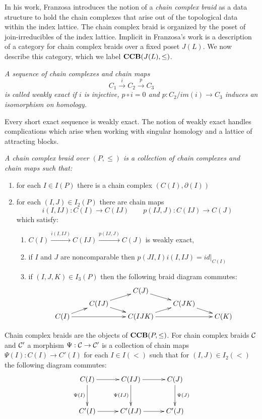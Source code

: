 In his work, Franzosa introduces the notion of a {\em chain complex braid} as a data structure to hold the chain complexes that arise out of the topological data within the index lattice.  The chain complex braid is organized by the poset of join-irreducibles of the index lattice.  Implicit in Franzosa's work is a description of a category for chain complex braids over a fixed poset $J(L)$.  We now describe this category, which we label ${\bf CCB}(J(L),\leq)$.

\begin{defn}
{\em
A sequence of chain complexes and chain maps $$C_1\xrightarrow{i} C_2 \xrightarrow{p} C_3$$
is called {\em weakly exact} if $i$ is injective, $p\circ i = 0$ and $p:C_2/im(i)\to C_3$ induces an isomorphism on homology.
}
\end{defn}
\begin{rem}
Every short exact sequence is weakly exact. The notion of weakly exact handles complications which arise when working with singular homology and a lattice of attracting blocks.
\end{rem}

\begin{defn}
{\em
A {\em chain complex braid} over $(P,\leq)$ is a collection of chain complexes and chain maps such that:
\begin{enumerate}
\item for each $I\in I(P)$ there is a chain complex $(C(I),\partial(I))$
\item for each $(I,J)\in I_2(P)$ there are chain maps $$i(I,IJ):C(I)\to C(IJ)\quad\quad p(IJ,J):C(IJ)\to C(J)$$ which satisfy:
\begin{enumerate}
\item $C(I)\xrightarrow{i(I,IJ)} C(IJ)\xrightarrow{p(IJ,J)} C(J)$ is weakly exact,
\item if $I$ and $J$ are noncomparable then $p(JI,I)i(I,IJ)=id|_{C(I)}$
\item if $(I,J,K)\in I_3(P)$ then the following braid diagram commutes:
\[
\xymatrixrowsep{0.03in}
\xymatrixcolsep{0.3in}
\xymatrix{
& & C(J) \ar[dr] & &  \\
& C(IJ) \ar[ur] \ar[dr] & & C(JK) \ar[dr] &  \\
C(I) \ar[ur] \ar[rr]& & C(IJK) \ar[rr] \ar[ur]& & C(K) 
}
\]
\end{enumerate}

\end{enumerate}
}
\end{defn}

Chain complex braids are the objects of ${\bf CCB}(P,\leq)$.  For  chain complex braids ${\mathcal C}$ and ${\mathcal C}'$ a morphism $\Psi:{\mathcal C}\to {\mathcal C}'$  is a collection of chain maps $\Psi(I):C(I)\to C'(I)$ for each $I\in I(<)$ such that for $(I,J)\in I_2(<)$ the following diagram commutes:
\[
\xymatrixcolsep{0.4in}
\xymatrixrowsep{0.4in}
\xymatrix{
C(I) \ar[r] \ar@{->}[d]_{\Psi(I)} & C(IJ) \ar@{->}[d]_{\Psi(IJ)} \ar[r] & C(J) \ar@{->}[d]^{\Psi(J)}  \\
C'(I) \ar[r] & C'(IJ) \ar[r] & C'(J)
}
\] 

